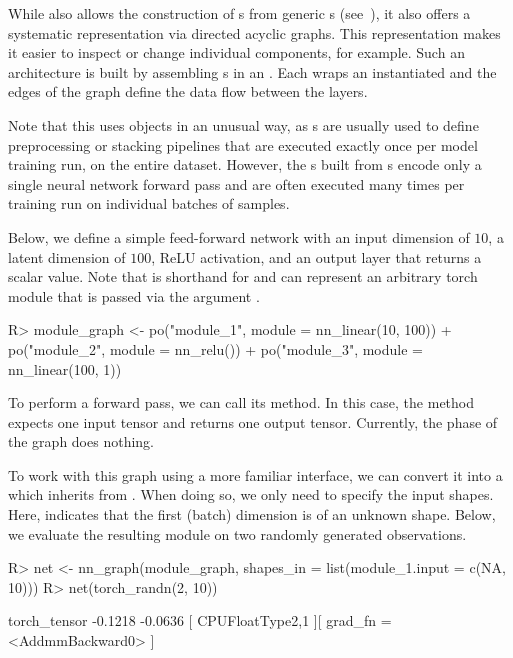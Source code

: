 \documentclass[article]{jss}
\theoremstyle{definition}
\begin{document}
While  also allows the construction of s from generic s (see~), it also offers a systematic representation via directed acyclic graphs. This representation makes it easier to inspect or change individual components, for example.
Such an architecture is built by assembling s in an .
Each  wraps an instantiated  and the edges of the graph define the data flow between the layers.

Note that this uses  objects in an unusual way, as
 s are usually used to define preprocessing or stacking pipelines that are executed exactly once per model training run, on the entire dataset.
However, the s built from s encode only a single neural network forward pass and are often executed many times per training run on individual batches of samples.

Below, we define a simple feed-forward network with an input dimension of $10$, a latent dimension of $100$, ReLU activation, and an output layer that returns a scalar value.
Note that  is shorthand for  and can represent an arbitrary torch module that is passed via the argument .

\begin{CodeInput}
R> module_graph <- po("module_1", module = nn_linear(10, 100)) %
+   po("module_2", module = nn_relu()) %
+   po("module_3", module = nn_linear(100, 1))
\end{CodeInput}

To perform a forward pass, we can call its  method.
In this case, the method expects one input tensor and returns one output tensor.
Currently, the  phase of the graph does nothing.

To work with this graph using a more familiar interface, we can convert it into a  which inherits from .
When doing so, we only need to specify the input shapes. Here,  indicates that the first (batch) dimension is of an unknown shape.
Below, we evaluate the resulting module on two randomly generated observations.

\begin{CodeInput}
R> net <- nn_graph(module_graph, shapes_in = list(module_1.input = c(NA, 10)))
R> net(torch_randn(2, 10))
\end{CodeInput}
\begin{CodeOutput}
torch_tensor
-0.1218
-0.0636
[ CPUFloatType{2,1} ][ grad_fn = <AddmmBackward0> ]
\end{CodeOutput}
\end{document}
